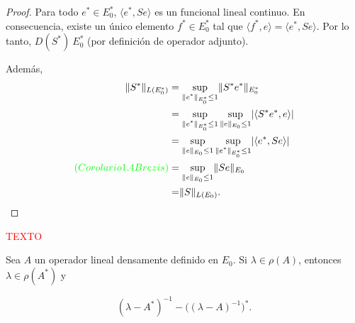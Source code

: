 \begin{proof}
    Para todo $e^* \in E_0^*$, $\langle e^*, Se \rangle$ es un funcional lineal continuo. En consecuencia, existe un único elemento $f^* \in E_0^*$ tal que $\langle f^*, e \rangle = \langle e^*, Se \rangle$. Por lo tanto, $D(S^*) \ E_0^*$ (por definición de operador adjunto).

    Además,
    \begin{align*}
        \lVert S^* \rVert_{L(E^*_0)} &= \sup_{\substack{\lVert e^* \rVert_{E_0^*} \leq 1}} \lVert S^* e^* \rVert_{E_0^*}\\
        &= \sup_{\substack{\lVert e^* \rVert_{E_0^*} \leq 1}} \sup_{\substack{\lVert e \rVert_{E_0} \leq 1}} \lvert \langle S^* e^*, e \rangle \rvert\\
        &= \sup_{\substack{\lVert e \rVert_{E_0} \leq 1}} \sup_{\substack{\lVert e^* \rVert_{E_0^*} \leq 1}} \lvert \langle e^*, Se \rangle \rvert\\
        \textcolor{green}{(Corolario 1.4 Brezis)} &= \sup_{\substack{\lVert e \rVert_{E_0} \leq 1}} \lVert Se \rVert_{E_0}\\
        &= \rVert S \lVert_{L(E_0)}.
    \end{align*}
\end{proof}

\textcolor{red}{TEXTO}\\

\begin{Lema}
    \label{ch:semigrupos:section:dual:lema:espectroOperadorAdjunto}

    Sea $A$ un operador lineal densamente definido en $E_0$. Si $\lambda \in \rho(A)$, entonces $\lambda \in \rho(A^*)$ y

    \[(\lambda - A^*)^{-1} - \big((\lambda - A)^{-1} \big)^*.\]
\end{Lema}

